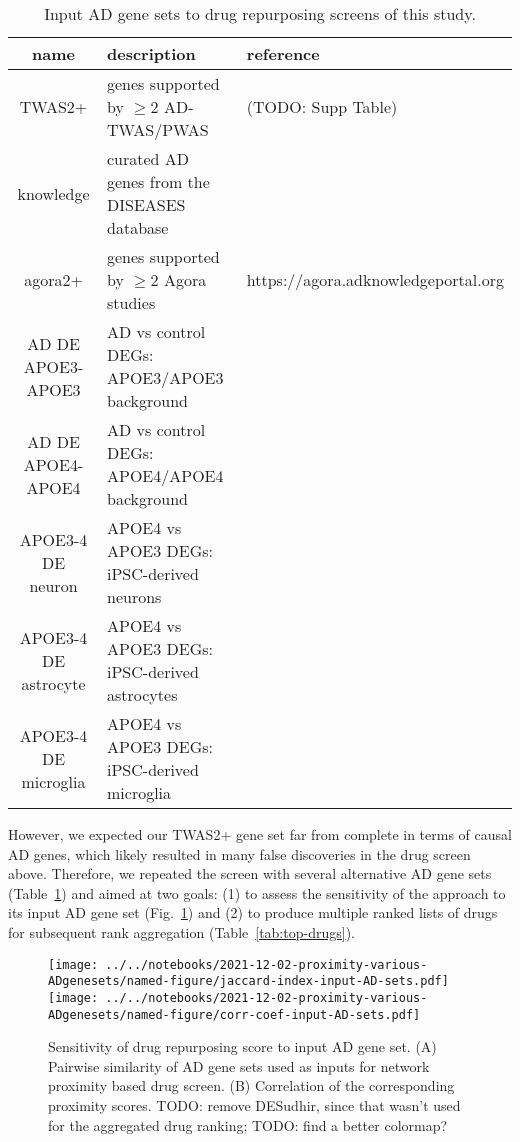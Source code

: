\documentclass[letterpaper]{article}
\begin{document}
\begin{table}
\footnotesize
\begin{tabular}{cll}
name     & description & reference  \\
\hline
TWAS2+   & genes supported by $\ge 2$ AD-TWAS/PWAS & (TODO: Supp Table)  \\
knowledge& curated AD genes from the DISEASES database & \cite{PletscherFrankild2015} \\
agora2+  & genes supported by $\ge 2$ Agora studies & https://agora.adknowledgeportal.org \\
AD DE APOE3-APOE3 & AD vs control DEGs: APOE3/APOE3 background & \cite{Taubes2021} \\
AD DE APOE4-APOE4 & AD vs control DEGs: APOE4/APOE4 background & \cite{Taubes2021} \\
APOE3-4 DE neuron & APOE4 vs APOE3 DEGs: iPSC-derived neurons& \cite{Lin2018} \\
APOE3-4 DE astrocyte & APOE4 vs APOE3 DEGs: iPSC-derived astrocytes& \cite{Lin2018} \\
APOE3-4 DE microglia & APOE4 vs APOE3 DEGs: iPSC-derived microglia& \cite{Lin2018} \\
\end{tabular}
\caption{
Input AD gene sets to drug repurposing screens of this study.
}
\label{tab:genesets}
\end{table}

However, we expected our TWAS2+ gene set far from complete in terms of
causal AD genes, which likely resulted in many false discoveries in the
drug screen above.  Therefore, we repeated the screen with several alternative AD gene
sets (Table~\ref{tab:genesets}) and aimed at two goals: (1) to assess the
sensitivity of the approach to its input AD gene set
(Fig.~\ref{fig:divergent-results}) and (2) to produce multiple ranked lists of
drugs for subsequent rank aggregation (Table~\ref{tab:top-drugs}).

\begin{figure}
\texttt{[image: ../../notebooks/2021-12-02-proximity-various-ADgenesets/named-figure/jaccard-index-input-AD-sets.pdf]}
\texttt{[image: ../../notebooks/2021-12-02-proximity-various-ADgenesets/named-figure/corr-coef-input-AD-sets.pdf]}
\caption{
  Sensitivity of drug repurposing score to input AD gene set. (A) Pairwise
  similarity of AD gene sets used as inputs for network proximity based drug
  screen.  (B) Correlation of the corresponding proximity scores.
TODO: remove DESudhir, since that wasn't used for the aggregated drug ranking;
TODO: find a better colormap?
}
\label{fig:divergent-results}
\end{figure}
\end{document}
